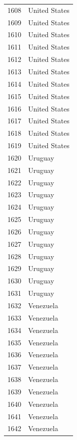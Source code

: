 \documentclass[
  letterpaper,
  DIV=11,
  numbers=noendperiod]{scrreprt}
\begin{document}
\begin{tabular}{ll}
1608 &             United States \\
1609 &             United States \\
1610 &             United States \\
1611 &             United States \\
1612 &             United States \\
1613 &             United States \\
1614 &             United States \\
1615 &             United States \\
1616 &             United States \\
1617 &             United States \\
1618 &             United States \\
1619 &             United States \\
1620 &                   Uruguay \\
1621 &                   Uruguay \\
1622 &                   Uruguay \\
1623 &                   Uruguay \\
1624 &                   Uruguay \\
1625 &                   Uruguay \\
1626 &                   Uruguay \\
1627 &                   Uruguay \\
1628 &                   Uruguay \\
1629 &                   Uruguay \\
1630 &                   Uruguay \\
1631 &                   Uruguay \\
1632 &                 Venezuela \\
1633 &                 Venezuela \\
1634 &                 Venezuela \\
1635 &                 Venezuela \\
1636 &                 Venezuela \\
1637 &                 Venezuela \\
1638 &                 Venezuela \\
1639 &                 Venezuela \\
1640 &                 Venezuela \\
1641 &                 Venezuela \\
1642 &                 Venezuela \\

\end{tabular}
\end{document}

